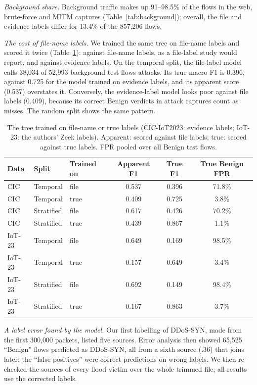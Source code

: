 \emph{Background share.} Background traffic makes up 91--98.5\% of the flows in the web, brute-force and MITM captures (Table~\ref{tab:background}); overall, the file and evidence labels differ for 13.4\% of the 857,206 flows.

\emph{The cost of file-name labels.} We trained the same tree on file-name labels and scored it twice (Table~\ref{tab:filelabel}): against file-name labels, as a file-label study would report, and against evidence labels. On the temporal split, the file-label model calls 38,034 of 52,993 background test flows attacks. Its true macro-F1 is 0.396, against 0.725 for the model trained on evidence labels, and its apparent score (0.537) overstates it. Conversely, the evidence-label model looks poor against file labels (0.409), because its correct Benign verdicts in attack captures count as misses. The random split shows the same pattern.

\begin{table}[t]
\centering
\caption{The tree trained on file-name or true labels (CIC-IoT2023: evidence labels; IoT-23: the authors' Zeek labels). Apparent: scored against file labels; true: scored against true labels. FPR pooled over all Benign test flows.}
\label{tab:filelabel}
\footnotesize
\setlength{\tabcolsep}{3pt}
\begin{tabular}{lllccc}
\hline
Data & Split & Trained on & Apparent F1 & True F1 & True Benign FPR \\
\hline
CIC & Temporal   & file & 0.537 & 0.396 & 71.8\% \\
CIC & Temporal   & true & 0.409 & 0.725 & 3.8\% \\
CIC & Stratified & file & 0.617 & 0.426 & 70.2\% \\
CIC & Stratified & true & 0.439 & 0.867 & 1.1\% \\
\hline
IoT-23 & Temporal   & file & 0.649 & 0.169 & 98.5\% \\
IoT-23 & Temporal   & true & 0.157 & 0.649 & 3.4\% \\
IoT-23 & Stratified & file & 0.692 & 0.149 & 98.4\% \\
IoT-23 & Stratified & true & 0.167 & 0.863 & 3.7\% \\
\hline
\end{tabular}
\end{table}

\emph{A label error found by the model.} Our first labelling of DDoS-SYN, made from the first 300,000 packets, listed five sources. Error analysis then showed 65,525 ``Benign'' flows predicted as DDoS-SYN, all from a sixth source (.36) that joins later: the ``false positives'' were correct predictions on wrong labels. We then re-checked the sources of every flood victim over the whole trimmed file; all results use the corrected labels.


